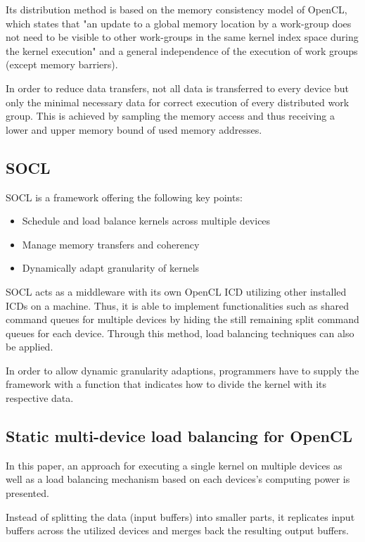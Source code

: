 Its distribution method is based on the memory consistency model of OpenCL, which states that "an update to a global memory location by a work-group does not need to be visible to other work-groups in the same kernel index space during the kernel execution" and a general independence of the execution of work groups (except memory barriers).

In order to reduce data transfers, not all data is transferred to every device but only the minimal necessary data for correct execution of every distributed work group. This is achieved by sampling the memory access and thus receiving a lower and upper memory bound of used memory addresses.

\subsection{SOCL\cite{socl}}
SOCL is a framework offering the following key points:
\begin{itemize}
    \item Schedule and load balance kernels across multiple devices
    \item Manage memory transfers and coherency
    \item Dynamically adapt granularity of kernels
\end{itemize}

SOCL acts as a middleware with its own OpenCL ICD utilizing other installed ICDs on a machine. Thus, it is able to implement functionalities such as shared command queues for multiple devices by hiding the still remaining split command queues for each device. Through this method, load balancing techniques can also be applied.

In order to allow dynamic granularity adaptions, programmers have to supply the framework with a function that indicates how to divide the kernel with its respective data.

\subsection{Static multi-device load balancing for OpenCL\cite{delalama_2012}}
In this paper, an approach for executing a single kernel on multiple devices as well as a load balancing mechanism based on each devices's computing power is presented.

Instead of splitting the data (input buffers) into smaller parts, it replicates input buffers across the utilized devices and merges back the resulting output buffers.

